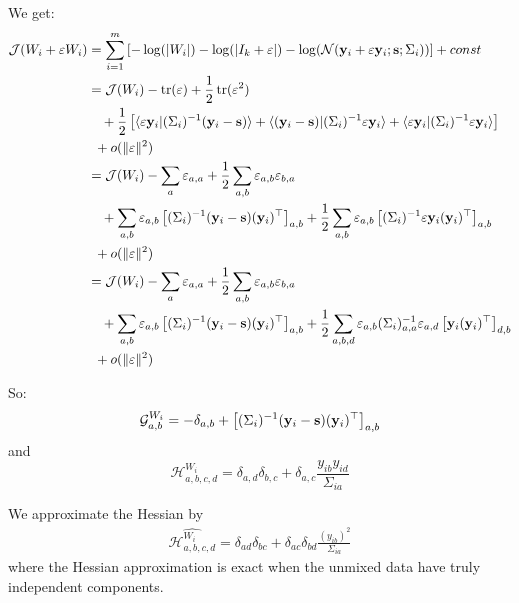 \documentclass{report}
\begin{document}
{ We get:
 \begin{align}
   \mathcal{J}(W_i + \varepsilon W_i) &= \sum_{i=1}^m \left[ -\log(|W_i|) -\log(|I_k + \varepsilon|) - \log(\mathcal{N}(\mathbf{y}_i + \varepsilon \mathbf{y}_i; \mathbf{s}; \Sigma_i)) \right] + const \\
                                      &= \mathcal{J}(W_i) - \mathop{\mathrm{tr}}(\varepsilon) + \frac12 \mathop{\mathrm{tr}}(\varepsilon^2) \\& \enspace \enspace + \frac12 \left[\langle \varepsilon \mathbf{y}_i| (\Sigma_i)^{-1} (\mathbf{y}_i - \mathbf{s}) \rangle + \langle (\mathbf{y}_i - \mathbf{s})| (\Sigma_i)^{-1} \varepsilon \mathbf{y}_i \rangle + \langle \varepsilon \mathbf{y}_i| (\Sigma_i)^{-1} \varepsilon \mathbf{y}_i \rangle \right] \\ & \enspace + o(\|\varepsilon\|^2) \\
   &= \mathcal{J}(W_i) - \sum_a \varepsilon_{a, a} + \frac12 \sum_{a, b} \varepsilon_{a,b} \varepsilon_{b, a} \\& \enspace \enspace + \sum_{a, b} \varepsilon_{a, b} \left[(\Sigma_i)^{-1}(\mathbf{y}_i - \mathbf{s}) (\mathbf{y}_i)^{\top} \right]_{a, b} + \frac12 \sum_{a, b} \varepsilon_{a, b} \left[(\Sigma_i)^{-1} \varepsilon \mathbf{y}_i (\mathbf{y}_i)^{\top}\right]_{a, b} \\ & \enspace + o(\|\varepsilon\|^2) \\
   &= \mathcal{J}(W_i) - \sum_a \varepsilon_{a, a} + \frac12 \sum_{a, b} \varepsilon_{a,b} \varepsilon_{b, a} \\& \enspace \enspace + \sum_{a, b} \varepsilon_{a, b} \left[(\Sigma_i)^{-1}(\mathbf{y}_i - \mathbf{s}) (\mathbf{y}_i)^{\top} \right]_{a, b} + \frac12 \sum_{a, b, d} \varepsilon_{a, b} (\Sigma_i)^{-1}_{a, a} \varepsilon_{a, d} \left[\mathbf{y}_i (\mathbf{y}_i)^{\top}\right]_{d, b} \\ & \enspace + o(\|\varepsilon\|^2) \\
 \end{align}

 So:
 \begin{equation}
 \mathcal{G}^{W_i}_{a, b} =  -\delta_{a,b} + \left[(\Sigma_i)^{-1} (\mathbf{y}_i - \mathbf{s})(\mathbf{y}_i)^{\top}\right]_{a, b}
 \end{equation}
 and
 \begin{equation}
 \mathcal{H}^{W_i}_{a, b, c, d} = \delta_{a, d}\delta_{b, c} + \delta_{a, c} \frac{y_{ib} y_{id}}{\Sigma_{ia}}
 \end{equation}
 
 We approximate the Hessian by
 \begin{align}
 \widehat{\mathcal{H}^{W_i}_{a, b, c, d}} = \delta_{ad} \delta_{bc} + \delta_{ac} \delta_{bd}\frac{(y_{ib})^2}{\Sigma_{ia}}
\end{align}
where the Hessian approximation is exact when the unmixed data have truly independent components.

}
\end{document}
